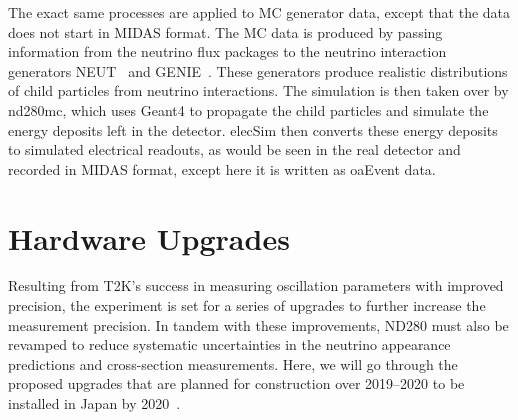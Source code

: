 \documentclass[aps,pra,12pt,notitlepage,tightenlines]{revtex4-1}
\begin{document}
The exact same processes are applied to MC generator data, except that the data does not start in MIDAS format. The MC data is produced by passing information from the neutrino flux packages to the neutrino interaction generators NEUT~\cite{Hayato:2009zz} and GENIE~\cite{Andreopoulos2010}. These generators produce realistic distributions of child particles from neutrino interactions. The simulation is then taken over by nd280mc, which uses Geant4 to propagate the child particles and simulate the energy deposits left in the detector. elecSim then converts these energy deposits to simulated electrical readouts, as would be seen in the real detector and recorded in MIDAS format, except here it is written as oaEvent data.
 
\section{Hardware Upgrades}
Resulting from T2K's success in measuring oscillation parameters with improved precision, the experiment is set for a series of upgrades to further increase the measurement precision. In tandem with these improvements, ND280 must also be revamped to reduce systematic uncertainties in the neutrino appearance predictions and cross-section measurements. Here, we will go through the proposed upgrades that are planned for construction over 2019--2020 to be installed in Japan by 2020~\cite{Blondel:2299599}.
\end{document}
